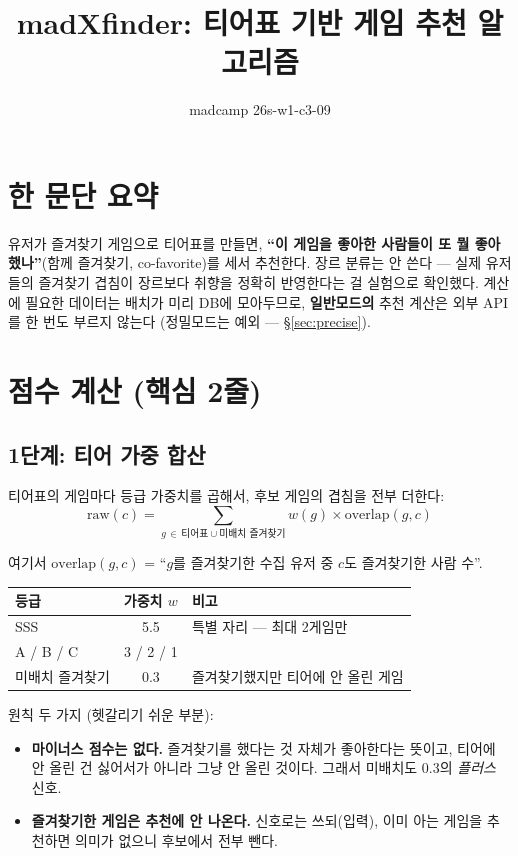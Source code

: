\documentclass[11pt]{article}
\title{madXfinder: 티어표 기반 게임 추천 알고리즘}
\author{madcamp 26s-w1-c3-09}
\date{}
\begin{document}
\maketitle

\section{한 문단 요약}

유저가 즐겨찾기 게임으로 티어표를 만들면, \textbf{``이 게임을 좋아한 사람들이 또 뭘
좋아했나''}(함께 즐겨찾기, co-favorite)를 세서 추천한다. 장르 분류는 안 쓴다 ---
실제 유저들의 즐겨찾기 겹침이 장르보다 취향을 정확히 반영한다는 걸 실험으로 확인했다.
계산에 필요한 데이터는 배치가 미리 DB에 모아두므로, \textbf{일반모드의} 추천 계산은
외부 API를 한 번도 부르지 않는다 (정밀모드는 예외 --- \S\ref{sec:precise}).

\section{점수 계산 (핵심 2줄)}

\subsection{1단계: 티어 가중 합산}

티어표의 게임마다 등급 가중치를 곱해서, 후보 게임의 겹침을 전부 더한다:
\begin{equation}
  \mathrm{raw}(c) = \sum_{g\,\in\,\text{티어표}\cup\text{미배치 즐겨찾기}} w(g)\times\mathrm{overlap}(g,c)
\end{equation}

여기서 $\mathrm{overlap}(g,c)$ = ``$g$를 즐겨찾기한 수집 유저 중 $c$도 즐겨찾기한 사람 수''.

\begin{center}
\begin{tabular}{lcl}
\toprule
등급 & 가중치 $w$ & 비고 \\
\midrule
SSS & 5.5 & 특별 자리 --- 최대 2게임만 \\
A / B / C & 3 / 2 / 1 & \\
미배치 즐겨찾기 & 0.3 & 즐겨찾기했지만 티어에 안 올린 게임 \\
\bottomrule
\end{tabular}
\end{center}

원칙 두 가지 (헷갈리기 쉬운 부분):
\begin{itemize}
  \item \textbf{마이너스 점수는 없다.} 즐겨찾기를 했다는 것 자체가 좋아한다는 뜻이고,
        티어에 안 올린 건 싫어서가 아니라 그냥 안 올린 것이다. 그래서 미배치도 0.3의
        \emph{플러스} 신호.
  \item \textbf{즐겨찾기한 게임은 추천에 안 나온다.} 신호로는 쓰되(입력),
        이미 아는 게임을 추천하면 의미가 없으니 후보에서 전부 뺀다.
\end{itemize}
\end{document}
